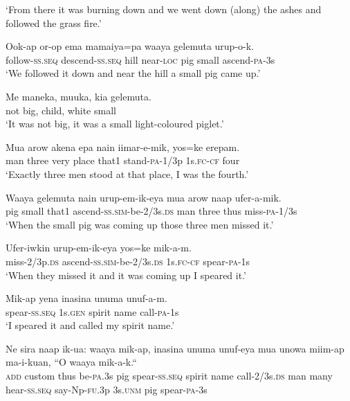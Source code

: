 \glt ‘From there it was burning down and we went down (along) the ashes and followed the grass fire.’ \\
\z


\ea
\gll  Ook-ap  or-op  ema  mamaiya=pa  waaya  gelemuta         urup-o-k. \\
follow-\textsc{ss.seq}  descend-\textsc{ss.seq}  hill  near-\textsc{loc}  pig  small     ascend-\textsc{pa}-3s \\


\glt ‘We followed it down and near the hill a small pig came up.’ \\
\z


\ea
\gll  Me  maneka,  muuka,  kia  gelemuta. \\
not  big,  child,  white  small \\
\glt ‘It was not big, it was a small light-coloured piglet.’ \\
\z


\ea
\gll  Mua  arow  akena  epa  nain  iimar-e-mik,  yos=ke  erepam. \\
man  three  very  place  that1  stand-\textsc{pa}-1/3p  1s.\textsc{fc}-\textsc{cf}  four \\
\glt ‘Exactly three men stood at that place, I was the fourth.’ \\
\z


\ea
\gll  Waaya  gelemuta  nain  urup-em-ik-eya  mua  arow  naap  ufer-a-mik. \\
pig  small  that1  ascend-\textsc{ss}.\textsc{sim}-be-2/3s.\textsc{ds}  man  three  thus  miss-\textsc{pa}-1/3s \\
\glt ‘When the small pig was coming up those three men missed it.’ \\
\z


\ea
\gll  Ufer-iwkin  urup-em-ik-eya  yos=ke  mik-a-m. \\
miss-2/3p.\textsc{ds}  ascend-\textsc{ss}.\textsc{sim}-be-2/3s.\textsc{ds}  1s.\textsc{fc}-\textsc{cf}  spear-\textsc{pa}-1s \\
\glt ‘When they missed it and it was coming up I speared it.’ \\
\z


\ea
\gll  Mik-ap  yena  inasina  unuma  unuf-a-m. \\
spear-\textsc{ss.seq}  1s.\textsc{gen}  spirit  name  call-\textsc{pa}-1s \\
\glt ‘I speared it and called my spirit name.’ \\
\z


\ea
\gll  Ne  sira  naap  ik-ua:  waaya  mik-ap,  inasina  unuma  unuf-eya         mua  unowa  miim-ap  ma-i-kuan,  ``O  waaya  mik-a-k.`` \\
\textsc{add}  custom  thus  be-\textsc{pa}.3s  pig  spear-\textsc{ss.seq}  spirit  name  call-2/3s.\textsc{ds}     man  many  hear-\textsc{ss.seq}  say-Np-\textsc{fu}.3p  3s.\textsc{unm}  pig  spear-\textsc{pa}-3s \\


